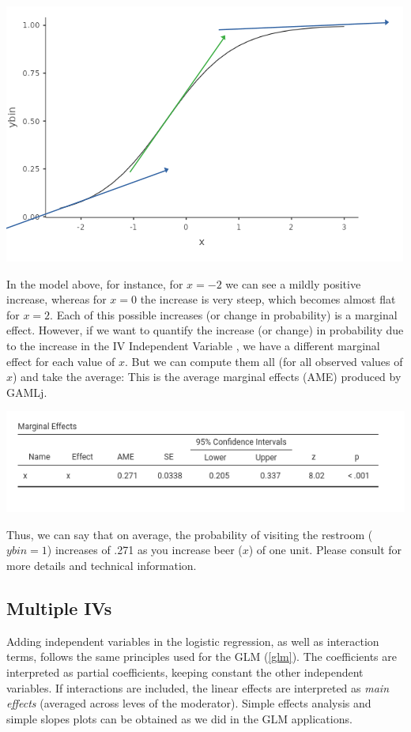 \documentclass[
]{book}
\begin{document}
\includegraphics{bookletpics/3_logistic_plot3.png}

In the model above, for instance, for \(x=-2\) we can see a mildly positive increase, whereas for \(x=0\) the increase is very steep, which becomes almost flat for \(x=2\). Each of this possible increases (or change in probability) is a marginal effect. However, if we want to quantify the increase (or change) in probability due to the increase in the {IV {Independent Variable} }, we have a different marginal effect for each value of \(x\). But we can compute them all (for all observed values of \(x\)) and take the average: This is the average marginal effects (AME) produced by {GAMLj}.

\includegraphics{bookletpics/3_logistic_output5.png}

Thus, we can say that on average, the probability of visiting the restroom (\(ybin=1\)) increases of .271 as you increase beer (\(x\)) of one unit.
Please consult \citet{thomas} for more details and technical information.

\hypertarget{multiple-ivs}{%
\subsection{Multiple IVs}\label{multiple-ivs}}

Adding independent variables in the logistic regression, as well as interaction terms, follows the same principles used for the GLM (\ref{glm}). The coefficients are interpreted as partial coefficients, keeping constant the other independent variables. If interactions are included, the linear effects are interpreted as \emph{main effects} (averaged across leves of the moderator). Simple effects analysis and simple slopes plots can be obtained as we did in the GLM applications.
\end{document}

